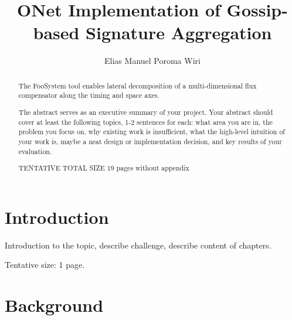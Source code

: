 \documentclass[a4paper,11pt,oneside]{report}
\title{ONet Implementation of Gossip-based Signature Aggregation}
\author{Elias Manuel Poroma Wiri}
\newcommand{\sysname}{FooSystem\xspace}
\begin{document}
\maketitle

\begin{abstract}
The \sysname tool enables lateral decomposition of a multi-dimensional
flux compensator along the timing and space axes.

The abstract serves as an executive summary of your project.
Your abstract should cover at least the following topics, 1-2 sentences for
each: what area you are in, the problem you focus on, why existing work is
insufficient, what the high-level intuition of your work is, maybe a neat
design or implementation decision, and key results of your evaluation.

TENTATIVE TOTAL SIZE 19 pages without appendix
\end{abstract}

\maketoc

\chapter{Introduction}


Introduction to the topic, describe challenge, describe content of chapters.

Tentative size: 1 page.

\chapter{Background}

\end{document}
